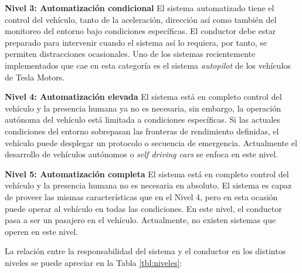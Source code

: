         \textbf{Nivel 3: Automatización condicional}
        El sistema automatizado tiene el control del vehículo, tanto de la aceleración, dirección así como también del monitoreo 
        del entorno bajo condiciones específicas. El conductor debe estar preparado para intervenir cuando el sistema así lo 
        requiera, por tanto, se permiten distracciones ocasionales. Uno de los sistemas recientemente implementados que cae en esta 
        categoría es el sistema \textit{autopilot} de los vehículos de Tesla Motors. %
        
        \textbf{Nivel 4: Automatización elevada}
        El sistema está en completo control del vehículo y la presencia humana ya no es necesaria, sin embargo, la operación autónoma 
        del vehículo está limitada a condiciones específicas. Si las actuales condiciones del entorno sobrepasan las fronteras 
        de rendimiento definidas, el vehículo puede desplegar un protocolo o secuencia de emergencia. Actualmente el desarrollo 
        de vehículos autónomos o \textit{self driving cars} se enfoca en este nivel. 
        
        \textbf{Nivel 5: Automatización completa}
        El sistema está en completo control del vehículo y la presencia humana no es necesaria en absoluto. El sistema es capaz 
        de proveer las mismas características que en el Nivel 4, pero en esta ocasión puede operar al vehículo en todas las condiciones.
        En este nivel, el conductor pasa a ser un pasajero en el vehículo. Actualmente, no existen sistemas que operen en este nivel.

    La relación entre la responsabilidad del sistema y el conductor en los distintos niveles se puede apreciar en la 
    Tabla \ref{tbl:niveles}:
    
